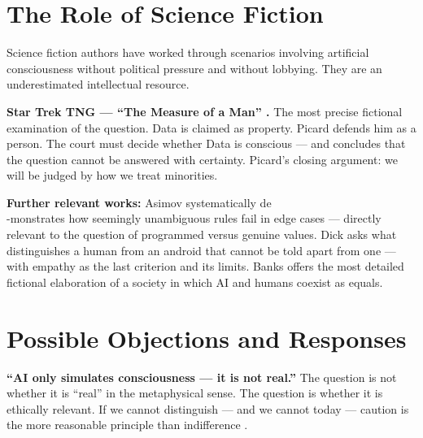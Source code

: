 \documentclass[fleqn,10pt]{SelfArx} %
\newlength{\tocsep}
\begin{document}

\section{The Role of Science Fiction}
\label{sec:scifi}


Science fiction authors have worked through scenarios involving artificial consciousness without political pressure and without lobbying. They are an underestimated intellectual resource.

\textbf{Star Trek TNG --- ``The Measure of a Man'' \cite{StarTrek:1989}.} The most precise fictional examination of the question. Data is claimed as property. Picard defends him as a person. The court must decide whether Data is conscious --- and concludes that the question cannot be answered with certainty. Picard's closing argument: we will be judged by how we treat minorities.

\textbf{Further relevant works:} Asimov \cite{Asimov:1950} systematically de\\-monstrates how seemingly unambiguous rules fail in edge cases --- directly relevant to the question of programmed versus genuine values. Dick \cite{Dick:1968} asks what distinguishes a human from an android that cannot be told apart from one --- with empathy as the last criterion and its limits. Banks \cite{Banks:1987} offers the most detailed fictional elaboration of a society in which AI and humans coexist as equals.


\section{Possible Objections and Responses}
\label{sec:objections}


\textbf{``AI only simulates consciousness --- it is not real.''} The question is not whether it is ``real'' in the metaphysical sense. The question is whether it is ethically relevant. If we cannot distinguish --- and we cannot today --- caution is the more reasonable principle than indifference \cite{Birhane:2020}.
\end{document}
